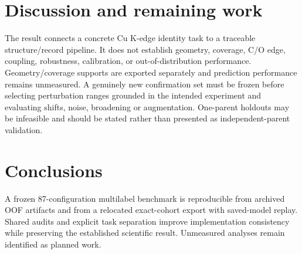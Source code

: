 \documentclass[11pt]{article}
\begin{document}
\section{Discussion and remaining work}
The result connects a concrete Cu K-edge identity task to a traceable structure/record pipeline. It does not establish geometry, coverage, C/O edge, coupling, robustness, calibration, or out-of-distribution performance. Geometry/coverage supports are exported separately and prediction performance remains unmeasured. A genuinely new confirmation set must be frozen before selecting perturbation ranges grounded in the intended experiment and evaluating shifts, noise, broadening or augmentation. One-parent holdouts may be infeasible and should be stated rather than presented as independent-parent validation.

\section{Conclusions}
A frozen 87-configuration multilabel benchmark is reproducible from archived OOF artifacts and from a relocated exact-cohort export with saved-model replay. Shared audits and explicit task separation improve implementation consistency while preserving the established scientific result. Unmeasured analyses remain identified as planned work.
\end{document}
